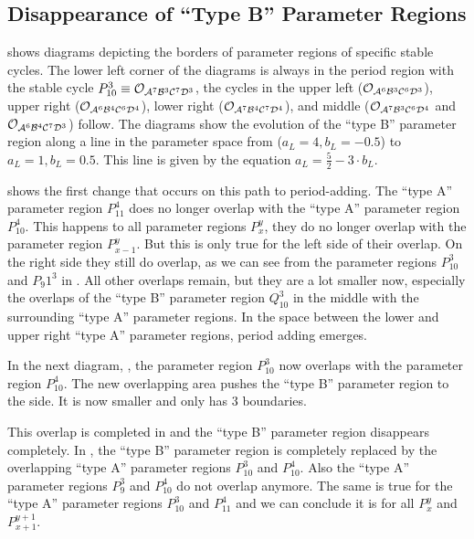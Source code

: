 \subsection{Disappearance of ``Type B'' Parameter Regions}
\label{sec:minrep.adding.disapp.typeB}


 shows diagrams depicting the borders of parameter regions of specific stable cycles.
The lower left corner of the diagrams is always in the period region with the stable cycle $P_{10}^3 \equiv \mathcal{O}_{\mathcal{A}^7\mathcal{B}^3\mathcal{C}^7\mathcal{D}^3}$, the cycles in the upper left ($\mathcal{O}_{\mathcal{A}^6\mathcal{B}^3\mathcal{C}^6\mathcal{D}^3}$), upper right ($\mathcal{O}_{\mathcal{A}^6\mathcal{B}^4\mathcal{C}^6\mathcal{D}^4}$), lower right ($\mathcal{O}_{\mathcal{A}^7\mathcal{B}^4\mathcal{C}^7\mathcal{D}^4}$), and middle ($\mathcal{O}_{\mathcal{A}^7\mathcal{B}^3\mathcal{C}^6\mathcal{D}^4}$ and $\mathcal{O}_{\mathcal{A}^6\mathcal{B}^4\mathcal{C}^7\mathcal{D}^3}$) follow.
The diagrams show the evolution of the ``type B'' parameter region along a line in the parameter space from  ($a_L = 4, b_L = -0.5$) to  $a_L = 1, b_L = 0.5$.
This line is given by the equation $a_L = \frac{5}{2} - 3 \cdot b_L$.

 shows the first change that occurs on this path to period-adding.
The ``type A'' parameter region $P_{11}^4$ does no longer overlap with the ``type A'' parameter region $P_{10}^4$.
This happens to all parameter regions $P_{x}^y$, they do no longer overlap with the parameter region $P_{x-1}^y$.
But this is only true for the left side of their overlap.
On the right side they still do overlap, as we can see from the parameter regions $P_{10}^3$ and $P_{9}1^3$ in .
All other overlaps remain, but they are a lot smaller now, especially the overlaps of the ``type B'' parameter region $Q_{10}^3$ in the middle with the surrounding ``type A'' parameter regions.
In the space between the lower and upper right ``type A'' parameter regions, period adding emerges.

In the next diagram, , the parameter region $P_{10}^3$ now overlaps with the parameter region $P_{10}^4$.
The new overlapping area pushes the ``type B'' parameter region to the side.
It is now smaller and only has 3 boundaries.

This overlap is completed in  and the ``type B'' parameter region disappears completely.
In , the ``type B'' parameter region is completely replaced by the overlapping ``type A'' parameter regions $P_{10}^3$ and $P_{10}^4$.
Also the ``type A'' parameter regions $P_9^3$ and $P_{10}^4$ do not overlap anymore.
The same is true for the ``type A'' parameter regions $P_{10}^3$ and $P_{11}^4$ and we can conclude it is for all $P_x^y$ and $P_{x+1}^{y+1}$.


